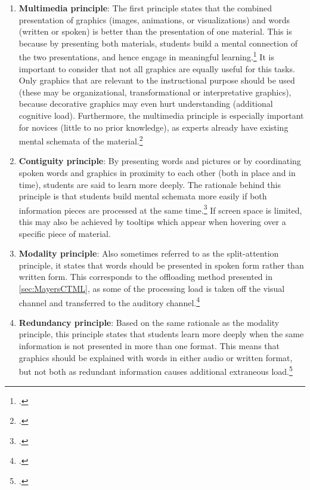 \begin{enumerate}
    \item \textbf{Multimedia principle}: The first principle states that the combined presentation of graphics (images, animations, or visualizations) and words (written or spoken) is better than the presentation of one material. This is because by presenting both materials, students build a mental connection of the two presentations, and hence engage in meaningful learning.\footcites[Cf.][p.19]{MayerAnimationAidMultimedia2001}[cf.][chapter 4, paragraph 7]{ClarkElearningscienceinstruction2016}[cf.][p.13]{MayerCognitiveTheoryMultimedia1999} It is important to consider that not all graphics are equally useful for this tasks. Only graphics that are relevant to the instructional purpose should be used (these may be organizational, transformational or interpretative graphics), because decorative graphics may even hurt understanding (additional cognitive load). Furthermore, the multimedia principle is especially important for novices (little to no prior knowledge), as experts already have existing mental schemata of the material.\footcites[Cf.][chapter 4, paragraphs 7 et seq]{ClarkElearningscienceinstruction2016}[cf. in addition][]{MayerWhenillustrationworth1990}
    \item \textbf{Contiguity principle}: By presenting words and pictures or by coordinating spoken words and graphics in proximity to each other (both in place and in time), students are said to learn more deeply. The rationale behind this principle is that students build mental schemata more easily if both information pieces are processed at the same time.\footcites[Cf.][pp. 19 et seq]{MayerAnimationAidMultimedia2001}[cf.][chapter 5, paragraphs 1 et seq.]{ClarkElearningscienceinstruction2016} If screen space is limited, this may also be achieved by tooltips which appear when hovering over a specific piece of material.
    \item \textbf{Modality principle}: Also sometimes referred to as the split-attention principle, it states that words should be presented in spoken form rather than written form. This corresponds to the offloading method presented in \ref{sec:MayersCTML}, as some of the processing load is taken off the visual channel and transferred to the auditory channel.\footcites[Cf.][p.22]{MayerAnimationAidMultimedia2001}[cf.][p.14]{MayerCognitiveTheoryMultimedia1999}
    \item \textbf{Redundancy principle}: Based on the same rationale as the modality principle, this principle states that students learn more deeply when the same information is not presented in more than one format. This means that graphics should be explained with words in either audio or written format, but not both as redundant information causes additional extraneous load.\footcites[Cf.][chapters 6 and 7]{ClarkElearningscienceinstruction2016}[cf.][p.6]{MayerMultimediaLearning2009}[cf.][p.22]{MayerAnimationAidMultimedia2001}[cf. in addition][]{MayerPrinciplesreducingextraneous2014}

\end{enumerate}
